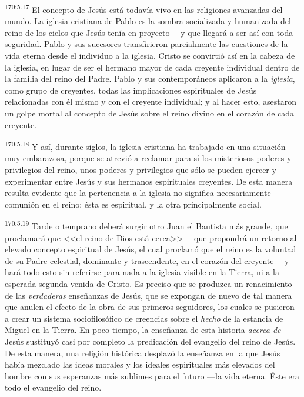\par 
\textsuperscript{170:5.17} El concepto de Jesús está todavía vivo en las religiones avanzadas del mundo. La iglesia cristiana de Pablo es la sombra socializada y humanizada del reino de los cielos que Jesús tenía en proyecto ---y que llegará a ser así con toda seguridad. Pablo y sus sucesores transfirieron parcialmente las cuestiones de la vida eterna desde el individuo a la iglesia. Cristo se convirtió así en la cabeza de la iglesia, en lugar de ser el hermano mayor de cada creyente individual dentro de la familia del reino del Padre. Pablo y sus contemporáneos aplicaron a la \textit{iglesia}, como grupo de creyentes, todas las implicaciones espirituales de Jesús relacionadas con él mismo y con el creyente individual; y al hacer esto, asestaron un golpe mortal al concepto de Jesús sobre el reino divino en el corazón de cada creyente.

\par 
\textsuperscript{170:5.18} Y así, durante siglos, la iglesia cristiana ha trabajado en una situación muy embarazosa, porque se atrevió a reclamar para sí los misteriosos poderes y privilegios del reino, unos poderes y privilegios que sólo se pueden ejercer y experimentar entre Jesús y sus hermanos espirituales creyentes. De esta manera resulta evidente que la pertenencia a la iglesia no significa necesariamente comunión en el reino; ésta es espiritual, y la otra principalmente social.

\par 
\textsuperscript{170:5.19} Tarde o temprano deberá surgir otro Juan el Bautista más grande, que proclamará que <<el reino de Dios está cerca>> ---que propondrá un retorno al elevado concepto espiritual de Jesús, el cual proclamó que el reino es la voluntad de su Padre celestial, dominante y trascendente, en el corazón del creyente--- y hará todo esto sin referirse para nada a la iglesia visible en la Tierra, ni a la esperada segunda venida de Cristo. Es preciso que se produzca un renacimiento de las \textit{verdaderas} enseñanzas de Jesús, que se expongan de nuevo de tal manera que anulen el efecto de la obra de sus primeros seguidores, los cuales se pusieron a crear un sistema sociofilosófico de creencias sobre el \textit{hecho} de la estancia de Miguel en la Tierra. En poco tiempo, la enseñanza de esta historia \textit{acerca de} Jesús sustituyó casi por completo la predicación del evangelio del reino de Jesús. De esta manera, una religión histórica desplazó la enseñanza en la que Jesús había mezclado las ideas morales y los ideales espirituales más elevados del hombre con sus esperanzas más sublimes para el futuro ---la vida eterna. Éste era todo el evangelio del reino.

